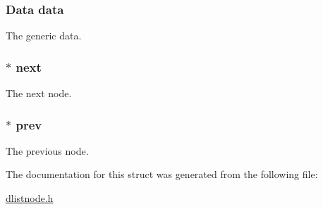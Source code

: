 \subsubsection[{\texorpdfstring{data}{data}}]{\setlength{\rightskip}{0pt plus 5cm}Data data}\hypertarget{struct_d_list_node_a6cd5475316bf41a2c56ffcc5de826b99}{}\label{struct_d_list_node_a6cd5475316bf41a2c56ffcc5de826b99}
The generic data. 
\subsubsection[{\texorpdfstring{next}{next}}]{$\ast$ next}\hypertarget{struct_d_list_node_a32e241d0c324727bdb3782359f1ec32d}{}\label{struct_d_list_node_a32e241d0c324727bdb3782359f1ec32d}
The next node. 
\subsubsection[{\texorpdfstring{prev}{prev}}]{$\ast$ prev}\hypertarget{struct_d_list_node_adb1424a5de3d7550dd098aa2b7e8f493}{}\label{struct_d_list_node_adb1424a5de3d7550dd098aa2b7e8f493}
The previous node. 

The documentation for this struct was generated from the following file\+:\begin{DoxyCompactItemize}
\item 
\hyperlink{dlistnode_8h}{dlistnode.\+h}\end{DoxyCompactItemize}
